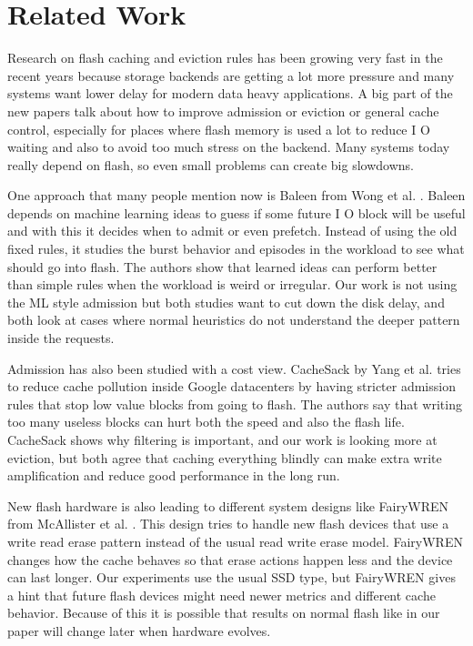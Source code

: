 \documentclass[sigconf]{acmart}
\begin{document}
\clearpage
\section{Related Work}

Research on flash caching and eviction rules has been growing very fast in the recent years because storage backends are getting a lot more pressure and many systems want lower delay for modern data heavy applications. A big part of the new papers talk about how to improve admission or eviction or general cache control, especially for places where flash memory is used a lot to reduce I O waiting and also to avoid too much stress on the backend. Many systems today really depend on flash, so even small problems can create big slowdowns.

One approach that many people mention now is Baleen from Wong et al. \cite{wong2024baleen}. Baleen depends on machine learning ideas to guess if some future I O block will be useful and with this it decides when to admit or even prefetch. Instead of using the old fixed rules, it studies the burst behavior and episodes in the workload to see what should go into flash. The authors show that learned ideas can perform better than simple rules when the workload is weird or irregular. Our work is not using the ML style admission but both studies want to cut down the disk delay, and both look at cases where normal heuristics do not understand the deeper pattern inside the requests.

Admission has also been studied with a cost view. CacheSack by Yang et al. \cite{Yang2022CacheSack} tries to reduce cache pollution inside Google datacenters by having stricter admission rules that stop low value blocks from going to flash. The authors say that writing too many useless blocks can hurt both the speed and also the flash life. CacheSack shows why filtering is important, and our work is looking more at eviction, but both agree that caching everything blindly can make extra write amplification and reduce good performance in the long run.

New flash hardware is also leading to different system designs like FairyWREN from McAllister et al. \cite{mcallister2024fairywren}. This design tries to handle new flash devices that use a write read erase pattern instead of the usual read write erase model. FairyWREN changes how the cache behaves so that erase actions happen less and the device can last longer. Our experiments use the usual SSD type, but FairyWREN gives a hint that future flash devices might need newer metrics and different cache behavior. Because of this it is possible that results on normal flash like in our paper will change later when hardware evolves.
\end{document}
